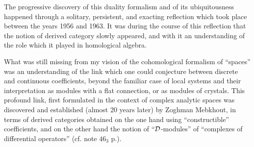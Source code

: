 The progressive discovery of this duality formalism 
and of its ubiquitousness 
happened through a solitary, persistent, and exacting reflection which took place between
the years 1956 and 1963.
It was during the course of this reflection that the notion of derived category slowly
appeared, and with it an understanding of the role which it played in homological algebra. 

What was still missing from my vision of the cohomological formalism of ``spaces'' was an
understanding of the link which one could conjecture between discrete and continuous
coefficients, beyond the familiar case of local systems 
and their interpretation as
modules with a flat connection, or as modules of crystals. 
This profound link, first formulated in the context of complex analytic spaces was
discovered and established (almost 20 years later) by Zoghman Mebkhout,
in terms of derived categories obtained on the one hand using ``constructible''
coefficients, and on the other hand the notion of ``$\mathcal{D}$-modules''
of ``complexes of differential operators'' (cf. note $46_3$ p.).

